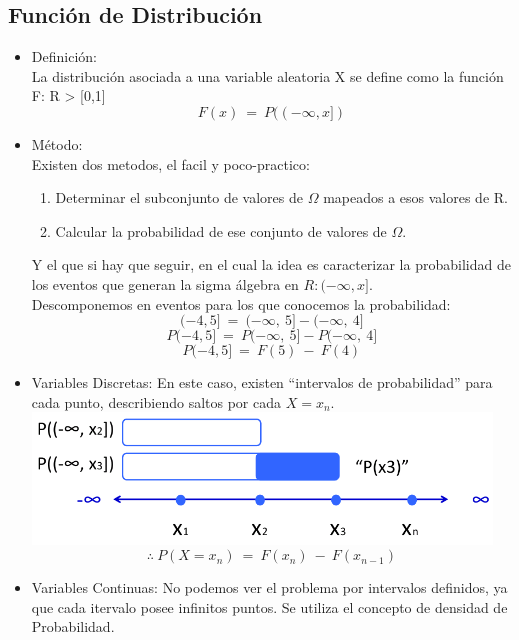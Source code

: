 	\subsection{Funci\'on de Distribuci\'on}
		\begin{itemize}
			\item Definici\'on:\\
                         	La distribuci\'on asociada a una variable aleatoria X se define como la funci\'on F: R \-> [0,1] $$ F(x)\ =\ P((-\infty, x])$$
			\item M\'etodo:\\
				Existen dos metodos, el facil y poco-practico:
				\begin{enumerate}
					\item Determinar el subconjunto de valores de $\Omega$ mapeados a esos valores de R.
					\item Calcular la probabilidad de ese conjunto de valores de $\Omega$.
				\end{enumerate}
				Y el que si hay que seguir, en el cual la idea es caracterizar la probabilidad de los eventos que generan la sigma \'algebra en $R: (-\infty, x]$.\\
				Descomponemos en eventos para los que conocemos la probabilidad:
				$$(-4,5]\ =\ (-\infty,\ 5] - (-\infty,\ 4]$$
				$$P(-4,5]\ =\ P(-\infty,\ 5] - P(-\infty,\ 4]$$
				$$P(-4,5]\ =\ F(5)\ -\ F(4)$$

			\item Variables Discretas:
				En este caso, existen ``intervalos de probabilidad'' para cada punto, describiendo saltos por cada $X=x_n$.\\
					\includegraphics[height=3.5cm]{images/cap7-discretas.png}\\
				$$\therefore\ P(X=x_n)\ =\ F(x_n)\ -\ F(x_{n-1})$$
			\item Variables Continuas: No podemos ver el problema por intervalos definidos, ya que cada itervalo posee infinitos puntos. Se utiliza el concepto de densidad de Probabilidad.
				
		\end{itemize}
